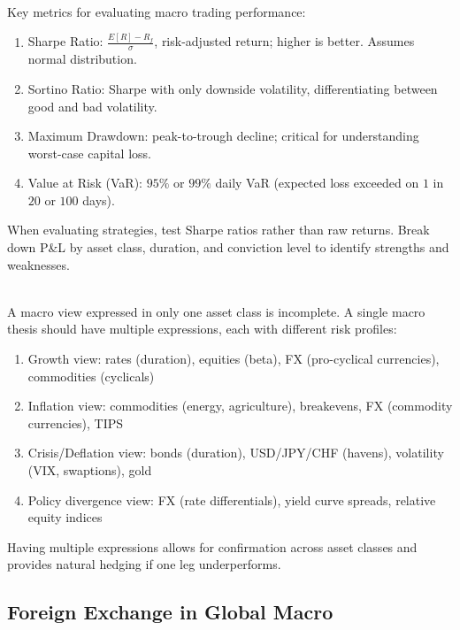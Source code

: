 \documentclass[a4paper,oneside,openany]{book}
\begin{document}
\begin{remark} \\
Key metrics for evaluating macro trading performance:
\begin{enumerate}[label=\roman*.]
\setlength{\itemsep}{0pt}
\item Sharpe Ratio: $\frac{E[R] - R_f}{\sigma}$, risk-adjusted return; higher is better. Assumes normal distribution.
\item Sortino Ratio: Sharpe with only downside volatility, differentiating between good and bad volatility.
\item Maximum Drawdown: peak-to-trough decline; critical for understanding worst-case capital loss.
\item Value at Risk (VaR): $95\%$ or $99\%$ daily VaR (expected loss exceeded on $1$ in $20$ or $100$ days).
\end{enumerate}
When evaluating strategies, test Sharpe ratios rather than raw returns. Break down P\&L by asset class, duration, and conviction level to identify strengths and weaknesses.
\end{remark}

\begin{remark} \\
A macro view expressed in only one asset class is incomplete. A single macro thesis should have multiple expressions, each with different risk profiles:
\begin{enumerate}[label=\roman*.]
\setlength{\itemsep}{0pt}
\item Growth view: rates (duration), equities (beta), FX (pro-cyclical currencies), commodities (cyclicals)
\item Inflation view: commodities (energy, agriculture), breakevens, FX (commodity currencies), TIPS
\item Crisis/Deflation view: bonds (duration), USD/JPY/CHF (havens), volatility (VIX, swaptions), gold
\item Policy divergence view: FX (rate differentials), yield curve spreads, relative equity indices
\end{enumerate}
Having multiple expressions allows for confirmation across asset classes and provides natural hedging if one leg underperforms.
\end{remark}

\subsection*{Foreign Exchange in Global Macro}
\end{document}
